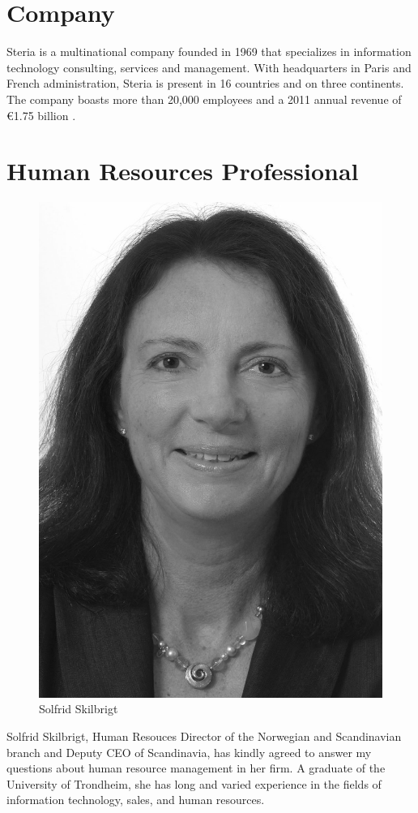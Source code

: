 \documentclass[letterpaper, 12pt]{report}
\begin{document}
\section{Company}
Steria is a multinational company founded in 1969 that specializes in information technology consulting, services and management. 
With headquarters in Paris and French administration, Steria is present in 16 countries and on three continents. 
The company boasts more than 20,000 employees and a 2011 annual revenue of €1.75 billion \parencite{steria:stats}.


\section{Human Resources Professional}
\begin{figure}
	\centering
	\includegraphics[width=\textwidth]{solfridbw}
	\caption*{Solfrid Skilbrigt}
\end{figure}
Solfrid Skilbrigt, Human Resouces Director of the Norwegian and Scandinavian branch and Deputy CEO of Scandinavia, has kindly agreed to answer my questions about human resource management in her firm. 
A graduate of the University of Trondheim, she has long and varied experience in the fields of information technology, sales, and human resources.
\end{document}
